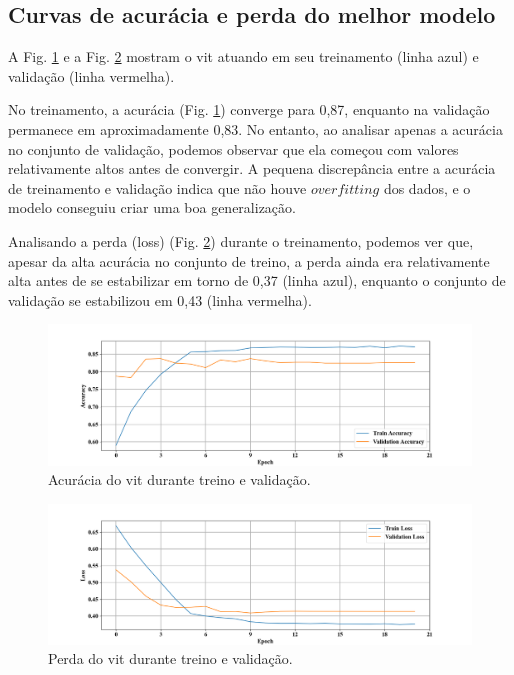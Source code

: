 \subsection{Curvas de acurácia e perda do melhor modelo}
A Fig. \ref{fig:acc} e a Fig. \ref{fig:loss} mostram o \acrshort{vit} atuando em seu treinamento (linha azul) e validação (linha vermelha).

No treinamento, a acurácia (Fig. \ref{fig:acc}) converge para 0,87, enquanto na validação permanece em aproximadamente 0,83. 
No entanto, ao analisar apenas a acurácia no conjunto de validação, podemos observar que ela começou com valores relativamente altos antes de convergir. 
A pequena discrepância entre a acurácia de treinamento e validação indica que não houve $overfitting$ dos dados, e o modelo conseguiu criar uma boa generalização.

Analisando a perda (loss) (Fig. \ref{fig:loss}) durante o treinamento, podemos ver que, apesar da alta acurácia no conjunto de treino, a perda ainda era relativamente alta antes de se estabilizar em torno de 0,37 (linha azul), enquanto o conjunto de validação se estabilizou em 0,43 (linha vermelha).

\begin{figure}[tb]
\centerline{\includegraphics[width=1\linewidth]{images/resultados/sgd_accuracy.png}}
\caption{Acurácia do \acrshort{vit} durante treino e validação.}
\label{fig:acc}
\end{figure}

\begin{figure}[tb]
\centerline{\includegraphics[width=1\linewidth]{images/resultados/sgd_loss.png}}
\caption{Perda do \acrshort{vit} durante treino e validação.}
\label{fig:loss}
\end{figure}

